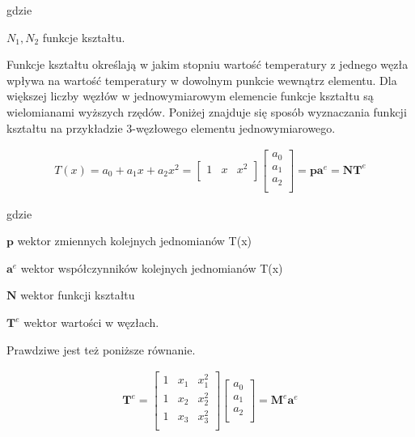 gdzie
\begin{eqwhere}[2cm]
	\item[$N_1, N_2 $] funkcje kształtu.

\end{eqwhere}

Funkcje kształtu określają w jakim stopniu wartość temperatury z jednego węzła wpływa na wartość temperatury w dowolnym punkcie wewnątrz elementu. Dla większej liczby węzłów w jednowymiarowym elemencie funkcje kształtu są wielomianami wyższych rzędów. Poniżej znajduje się sposób wyznaczania funkcji kształtu na przykładzie 3-węzłowego elementu jednowymiarowego.

\begin{gather} \label{eq:interpolacja}
T(x) = a_0 + a_1 x + a_2 x^2 =
	\begin{bmatrix} 
	 	1 & x& x^2 \\
	\end{bmatrix}
	\begin{bmatrix} 
	 	a_0 \\
		a_1 \\
		a_2 \\
	\end{bmatrix} = \textbf{p} \textbf{a}^e = \textbf{N} \textbf{T}^e
\end{gather}

gdzie
\begin{eqwhere}[2cm]
	\item[$\textbf{p} $] wektor zmiennych kolejnych jednomianów T(x)
	\item[$\textbf{a}^e $] wektor współczynników kolejnych jednomianów T(x)
	\item[$\textbf{N} $] wektor funkcji kształtu
	\item[$\textbf{T}^e $] wektor wartości w węzłach.
\end{eqwhere}

Prawdziwe jest też poniższe równanie.

\begin{gather}
\textbf{T}^e =
	\begin{bmatrix} 
	 	1 & x_1& x_1^2 \\
		1 & x_2& x_2^2 \\
		1 & x_3& x_3^2 \\
	\end{bmatrix}
	\begin{bmatrix} 
	 	a_0 \\
		a_1 \\
		a_2 \\
	\end{bmatrix}
= \textbf{M}^e \textbf{a}^e
\end{gather}

